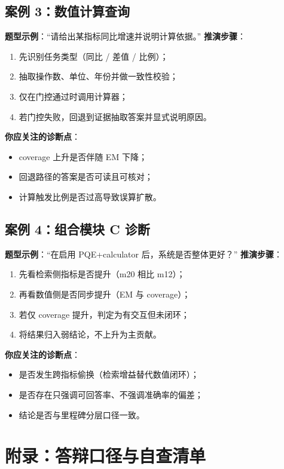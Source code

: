 \documentclass[UTF8,a4paper,12pt]{ctexart}
\begin{document}
\subsection*{案例 3：数值计算查询}
\textbf{题型示例}：``请给出某指标同比增速并说明计算依据。''  
\textbf{推演步骤}：
\begin{enumerate}
  \item 先识别任务类型（同比 / 差值 / 比例）；
  \item 抽取操作数、单位、年份并做一致性校验；
  \item 仅在门控通过时调用计算器；
  \item 若门控失败，回退到证据抽取答案并显式说明原因。
\end{enumerate}
\textbf{你应关注的诊断点}：
\begin{itemize}
  \item coverage 上升是否伴随 EM 下降；
  \item 回退路径的答案是否可读且可核对；
  \item 计算触发比例是否过高导致误算扩散。
\end{itemize}

\subsection*{案例 4：组合模块 C 诊断}
\textbf{题型示例}：``在启用 PQE+calculator 后，系统是否整体更好？''  
\textbf{推演步骤}：
\begin{enumerate}
  \item 先看检索侧指标是否提升（m20 相比 m12）；
  \item 再看数值侧是否同步提升（EM 与 coverage）；
  \item 若仅 coverage 提升，判定为有交互但未闭环；
  \item 将结果归入弱结论，不上升为主贡献。
\end{enumerate}
\textbf{你应关注的诊断点}：
\begin{itemize}
  \item 是否发生跨指标偷换（检索增益替代数值闭环）；
  \item 是否存在只强调可回答率、不强调准确率的偏差；
  \item 结论是否与里程碑分层口径一致。
\end{itemize}

\section{附录：答辩口径与自查清单}
\end{document}
